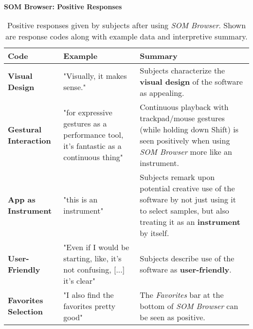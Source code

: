 \begin{table}[!ht]
  \textbf{SOM Browser: Positive Responses}
  \renewcommand{\arraystretch}{1.2}
  \centering
  \footnotesize
  \begin{tabular}{ p{4.0cm} p{4.75cm} p{4.75cm} }
  \hline
    \textbf{Code} & \textbf{Example} & \textbf{Summary} \\
    \hline
    \textbf{Visual Design}
    &
    "Visually, it makes sense."
    &
    Subjects characterize the \textbf{visual design} of the software as
    appealing.
    \\
    \textbf{Gestural Interaction}
    &
    "for expressive gestures as a performance tool, it’s fantastic as a
    continuous thing"
    &
    Continuous playback with trackpad/mouse gestures (while holding down Shift)
    is seen positively when using \textit{SOM Browser} more like an instrument.
    \\
    \textbf{App as Instrument}
    &
    "this is an instrument"
    &
    Subjects remark upon potential creative use of the software by not just
    using it to select samples, but also treating it as an \textbf{instrument}
    by itself.
    \\
    \textbf{User-Friendly}
    &
    "Even if I would be starting, like, it's not confusing, [...] it’s clear"
    &
    Subjects describe use of the software as \textbf{user-friendly}.
    \\
    \textbf{Favorites Selection}
    &
    "I also find the favorites pretty good"
    &
    The \textit{Favorites} bar at the bottom of \textit{SOM Browser} can be seen
    as positive.
    \\
  \end{tabular}
  \caption[\textit{SOM Browser}: Positive Responses]{Positive responses given
  by subjects after using \textit{SOM Browser}. Shown are response codes along
  with example data and interpretive summary.}
  \label{table:responses_som-browser_positive}
\end{table}

